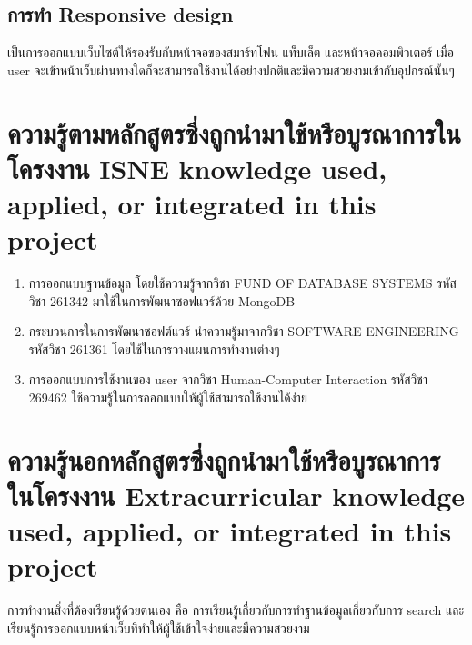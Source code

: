 \subsection{การทำ Responsive design}
เป็นการออกแบบเว็บไซต์ให้รองรับกับหน้าจอของสมาร์ทโฟน แท็บเล็ต และหน้าจอคอมพิวเตอร์ เมื่อ user จะเข้าหน้าเว็บผ่านทางใดก็จะสามารถใช้งานได้อย่างปกติและมีความสวยงามเข้ากับอุปกรณ์นั้นๆ 

\section{\ifcpe%
ความรู้ตามหลักสูตรซึ่งถูกนำมาใช้หรือบูรณาการในโครงงาน
\else%
ISNE knowledge used, applied, or integrated in this project
\fi
}
\begin{enumerate}
    \item การออกแบบฐานข้อมูล โดยใช้ความรู้จากวิชา FUND OF DATABASE SYSTEMS รหัส
วิชา 261342 มาใช้ในการพัฒนาซอฟแวร์ด้วย MongoDB
    \item กระบวนการในการพัฒนาซอฟต์แวร์ นำความรู้มาจากวิชา SOFTWARE
ENGINEERING รหัสวิชา 261361 โดยใช้ในการวางแผนการทำงานต่างๆ
    \item การออกแบบการใช้งานของ user จากวิชา Human-Computer Interaction รหัสวิชา 269462 ใช้ความรู้ในการออกแบบให้ผู้ใช้สามารถใช้งานได้ง่าย
\end{enumerate}

\section{\ifcpe%
ความรู้นอกหลักสูตรซึ่งถูกนำมาใช้หรือบูรณาการในโครงงาน
\else%
Extracurricular knowledge used, applied, or integrated in this project
\fi
}

การทำงานสิ่งที่ต้องเรียนรู้ด้วยตนเอง คือ การเรียนรู้เกี่ยวกับการทำฐานข้อมูลเกี่ยวกับการ search และเรียนรู้การออกแบบหน้าเว็บที่ทำให้ผู้ใช้เข้าใจง่ายและมีความสวยงาม 
